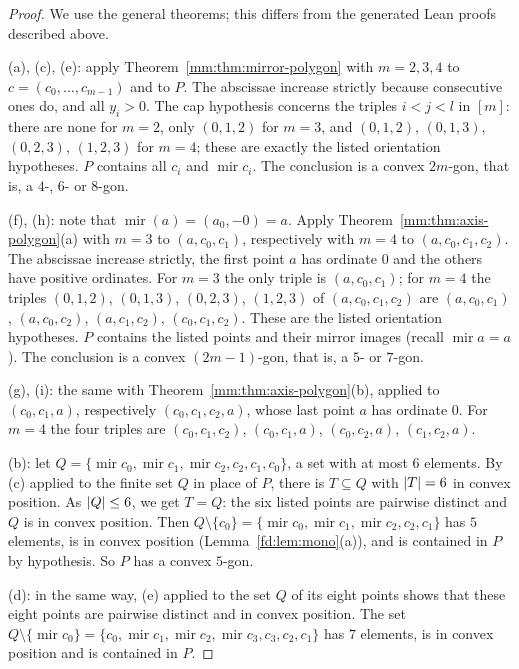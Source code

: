 \begin{proof}
We use the general theorems; this differs from the generated Lean proofs described above.

(a), (c), (e): apply Theorem~\ref{mm:thm:mirror-polygon} with $m=2,3,4$ to $c=(c_0,\dots,c_{m-1})$ and to
$P$. The abscissae increase strictly because consecutive ones do, and all $y_i>0$. The cap hypothesis
concerns the triples $i<j<l$ in $[m]$: there are none for $m=2$, only $(0,1,2)$ for $m=3$, and
$(0,1,2)$, $(0,1,3)$, $(0,2,3)$, $(1,2,3)$ for $m=4$; these are exactly the listed orientation hypotheses.
$P$ contains all $c_i$ and $\operatorname{mir}c_i$. The conclusion is a convex $2m$-gon, that is, a
$4$-, $6$- or $8$-gon.

(f), (h): note that $\operatorname{mir}(a)=(a_0,-0)=a$. Apply Theorem~\ref{mm:thm:axis-polygon}(a) with
$m=3$ to $(a,c_0,c_1)$, respectively with $m=4$ to $(a,c_0,c_1,c_2)$. The abscissae increase strictly, the
first point $a$ has ordinate $0$ and the others have positive ordinates. For $m=3$ the only triple is
$(a,c_0,c_1)$; for $m=4$ the triples $(0,1,2)$, $(0,1,3)$, $(0,2,3)$, $(1,2,3)$ of $(a,c_0,c_1,c_2)$ are
$(a,c_0,c_1)$, $(a,c_0,c_2)$, $(a,c_1,c_2)$, $(c_0,c_1,c_2)$. These are the listed orientation hypotheses.
$P$ contains the listed points and their mirror images (recall $\operatorname{mir}a=a$). The conclusion is
a convex $(2m-1)$-gon, that is, a $5$- or $7$-gon.

(g), (i): the same with Theorem~\ref{mm:thm:axis-polygon}(b), applied to $(c_0,c_1,a)$, respectively
$(c_0,c_1,c_2,a)$, whose last point $a$ has ordinate $0$. For $m=4$ the four triples are
$(c_0,c_1,c_2)$, $(c_0,c_1,a)$, $(c_0,c_2,a)$, $(c_1,c_2,a)$.

(b): let $Q=\{\operatorname{mir}c_0,\operatorname{mir}c_1,\operatorname{mir}c_2,c_2,c_1,c_0\}$, a set with
at most $6$ elements. By (c) applied to the finite set $Q$ in place of $P$, there is $T\subseteq Q$ with
$\lvert T\rvert=6$ in convex position. As $\lvert Q\rvert\le6$, we get $T=Q$: the six listed points are pairwise distinct
and $Q$ is in convex position. Then $Q\setminus\{c_0\}=\{\operatorname{mir}c_0,\operatorname{mir}c_1,
\operatorname{mir}c_2,c_2,c_1\}$ has $5$ elements, is in convex position (Lemma~\ref{fd:lem:mono}(a)), and
is contained in $P$ by hypothesis. So $P$ has a convex $5$-gon.

(d): in the same way, (e) applied to the set $Q$ of its eight points shows that these eight points are
pairwise distinct and in convex position. The set $Q\setminus\{\operatorname{mir}c_0\}=\{c_0,
\operatorname{mir}c_1,\operatorname{mir}c_2,\operatorname{mir}c_3,c_3,c_2,c_1\}$ has $7$ elements, is in
convex position and is contained in $P$.
\end{proof}

